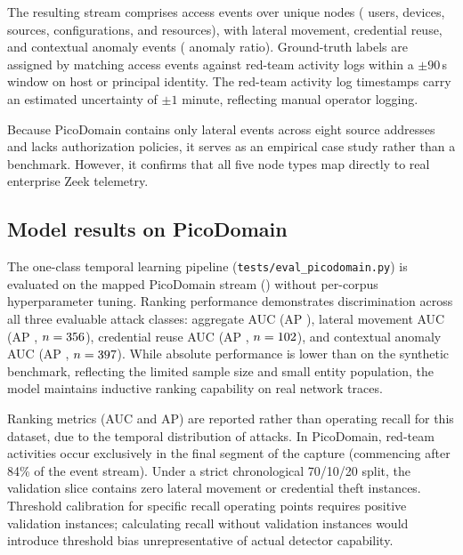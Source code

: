 The resulting stream comprises \PicoEvents{} access events over \PicoNodes{} unique nodes
(\PicoUsers{} users, \PicoDevices{} devices, \PicoSources{} sources, \PicoConfigs{} configurations,
and \PicoResources{} resources), with \PicoNlateral{} lateral movement, \PicoNtheft{} credential
reuse, and \PicoNctx{} contextual anomaly events (\PicoAnomFrac{} anomaly ratio). Ground-truth labels
are assigned by matching access events against red-team activity logs within a $\pm90$\,s window
on host or principal identity. The red-team activity log timestamps carry an estimated uncertainty
of $\pm1$ minute, reflecting manual operator logging.

Because PicoDomain contains only \PicoNlateral{} lateral events across eight source addresses
and lacks authorization policies, it serves as an empirical case study rather than a benchmark.
However, it confirms that all five node types map directly to real enterprise Zeek telemetry.

\subsection{Model results on PicoDomain}
\label{sec:pico-model}

The one-class temporal learning pipeline (\texttt{tests/eval\_picodomain.py}) is
evaluated on the mapped PicoDomain stream (\PicoModelSettings) without per-corpus hyperparameter tuning.
Ranking performance demonstrates discrimination across all three evaluable attack classes:
aggregate AUC \PicoModelAggAuc{} (AP \PicoModelAggAp), lateral movement AUC \PicoModelLatAuc{}
(AP \PicoModelLatAp, $n=356$), credential reuse AUC \PicoModelTheftAuc{} (AP
\PicoModelTheftAp, $n=102$), and contextual anomaly AUC \PicoModelCtxAuc{} (AP
\PicoModelCtxAp, $n=397$). While absolute performance is lower than on the synthetic
benchmark, reflecting the limited sample size and small entity population, the model
maintains inductive ranking capability on real network traces.

Ranking metrics (AUC and AP) are reported rather than operating recall for this dataset,
due to the temporal distribution of attacks. In PicoDomain, red-team activities occur exclusively in the
final segment of the capture (commencing after 84\% of the event stream). Under a strict
chronological 70/10/20 split, the validation slice contains zero lateral movement or credential
theft instances. Threshold calibration for specific recall operating points requires positive
validation instances; calculating recall without validation instances would introduce threshold
bias unrepresentative of actual detector capability.

